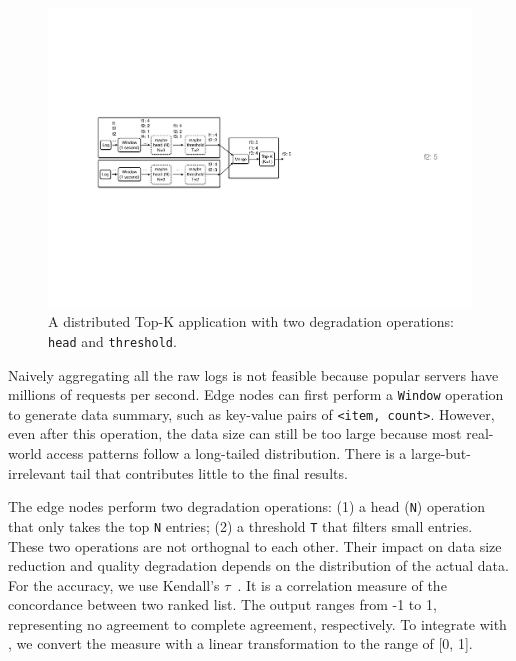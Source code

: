 \begin{figure}
  \centering
  \includegraphics[width=\columnwidth]{figures/topk.pdf}
  \caption{A distributed Top-K application with two degradation operations:
    \texttt{head} and \texttt{threshold}.}
  \label{fig:topk}
\end{figure}

Naively aggregating all the raw logs is not feasible because popular servers
have millions of requests per second. Edge nodes can first perform a
\texttt{Window} operation to generate data summary, such as key-value pairs of
\texttt{<item, count>}. However, even after this operation, the data size can
still be too large because most real-world access patterns follow a long-tailed
distribution. There is a large-but-irrelevant tail that contributes little to
the final results.

The edge nodes perform two degradation operations: (1) a head (\texttt{N})
operation that only takes the top \texttt{N} entries; (2) a threshold \texttt{T}
that filters small entries. These two operations are not orthognal to each
other. Their impact on data size reduction and quality degradation depends on
the distribution of the actual data. For the accuracy, we use Kendall's
$\tau$~\cite{abdi2007kendall}. It is a correlation measure of the concordance
between two ranked list. The output ranges from -1 to 1, representing no
agreement to complete agreement, respectively. To integrate with \sysname{}, we
convert the measure with a linear transformation to the range of [0, 1].

